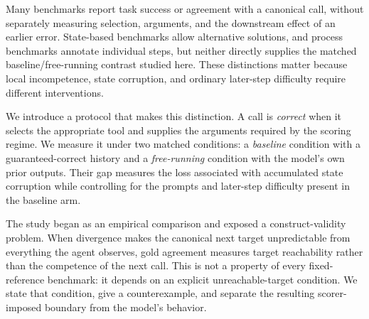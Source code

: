 \documentclass{article}
\begin{document}
Many benchmarks report task success or agreement with a canonical call, without separately measuring selection, arguments, and the downstream effect of an earlier error. State-based benchmarks allow alternative solutions, and process benchmarks annotate individual steps, but neither directly supplies the matched baseline/free-running contrast studied here. These distinctions matter because local incompetence, state corruption, and ordinary later-step difficulty require different interventions.

We introduce a protocol that makes this distinction. A call is \emph{correct} when it selects the appropriate tool and supplies the arguments required by the scoring regime. We measure it under two matched conditions: a \emph{baseline} condition with a guaranteed-correct history and a \emph{free-running} condition with the model's own prior outputs. Their gap measures the loss associated with accumulated state corruption while controlling for the prompts and later-step difficulty present in the baseline arm.

The study began as an empirical comparison and exposed a construct-validity problem. When divergence makes the canonical next target unpredictable from everything the agent observes, gold agreement measures target reachability rather than the competence of the next call. This is not a property of every fixed-reference benchmark: it depends on an explicit unreachable-target condition. We state that condition, give a counterexample, and separate the resulting scorer-imposed boundary from the model's behavior.
\end{document}
